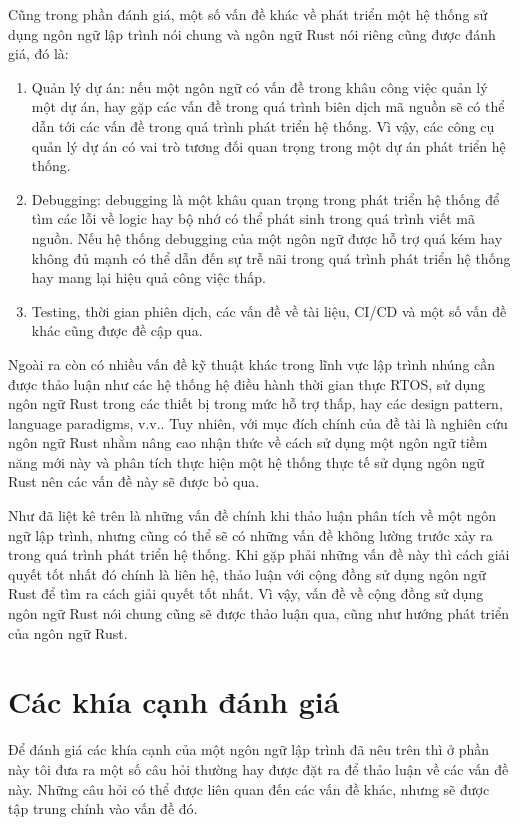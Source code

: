 Cũng trong phần đánh giá, một số vấn đề khác về phát triển một hệ thống sử dụng ngôn ngữ lập trình nói chung và ngôn ngữ Rust nói riêng cũng được đánh giá, đó là:

\begin{enumerate}
    \item Quản lý dự án: nếu một ngôn ngữ có vấn đề trong khâu công việc quản lý một dự án, hay gặp các vấn đề trong quá trình biên dịch mã nguồn sẽ có thể dẫn tới các vấn đề trong quá trình phát triển hệ thống. Vì vậy, các công cụ quản lý dự án có vai trò tương đối quan trọng trong một dự án phát triển hệ thống.

    \item Debugging: debugging là một khâu quan trọng trong phát triển hệ thống để tìm các lỗi về logic hay bộ nhớ có thể phát sinh trong quá trình viết mã nguồn.
Nếu hệ thống debugging của một ngôn ngữ được hỗ trợ quá kém hay không đủ mạnh có thể dẫn đến sự trễ nãi trong quá trình phát triển hệ thống hay mang lại hiệu quả công việc thấp.

    \item Testing, thời gian phiên dịch, các vấn đề về tài liệu, CI/CD và một số vấn đề khác cũng được đề cập qua.
\end{enumerate}

Ngoài ra còn có nhiều vấn đề kỹ thuật khác trong lĩnh vực lập trình nhúng cần được thảo luận như các hệ thống hệ điều hành thời gian thực RTOS, sử dụng ngôn ngữ Rust trong các thiết bị trong mức hỗ trợ thấp, hay các design pattern, language paradigms, v.v..
Tuy nhiên, với mục đích chính của đề tài là nghiên cứu ngôn ngữ Rust nhằm nâng cao nhận thức về cách sử dụng một ngôn ngữ tiềm năng mới này và phân tích thực hiện một hệ thống thực tế sử dụng ngôn ngữ Rust nên các vấn đề này sẽ được bỏ qua.

Như đã liệt kê trên là những vấn đề chính khi thảo luận phân tích về một ngôn ngữ lập trình, nhưng cũng có thể sẽ có những vấn đề không lường trước xảy ra trong quá trình phát triển hệ thống.
Khi gặp phải những vấn đề này thì cách giải quyết tốt nhất đó chính là liên hệ, thảo luận với cộng đồng sử dụng ngôn ngữ Rust để tìm ra cách giải quyết tốt nhất.
Vì vậy, vấn đề về cộng đồng sử dụng ngôn ngữ Rust nói chung cũng sẽ được thảo luận qua, cũng như hướng phát triển của ngôn ngữ Rust.

\section{Các khía cạnh đánh giá}\label{lbl:quality}
Để đánh giá các khía cạnh của một ngôn ngữ lập trình đã nêu trên thì ở phần này tôi đưa ra một số câu hỏi thường hay được đặt ra để thảo luận về các vấn đề này. Những câu hỏi có thể được liên quan đến các vấn đề khác, nhưng sẽ được tập trung chính vào vấn đề đó.
